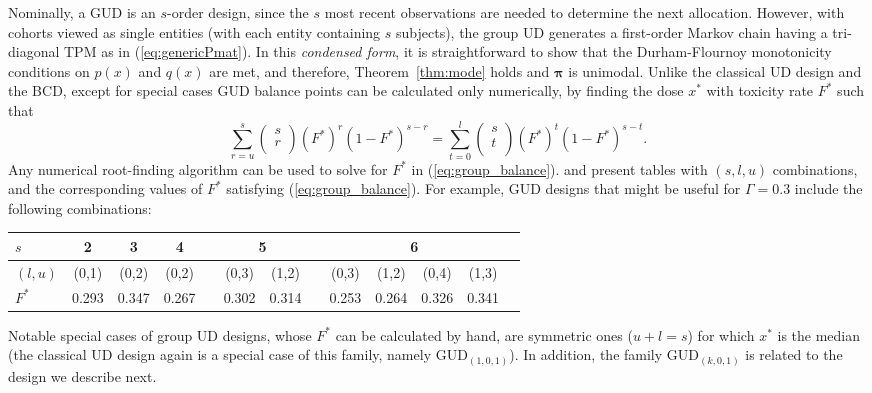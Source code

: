 Nominally, a GUD is an $s$-order design, since the $s$ most recent observations are needed to determine the next allocation. However, with cohorts viewed as single entities (with each entity containing $s$ subjects), the group UD generates a first-order Markov chain having a tri-diagonal TPM as in (\ref{eq:genericPmat}). In this \emph{condensed form}, it is straightforward to show that the Durham-Flournoy monotonicity conditions on $p(x)$ and $q(x)$ are met, and therefore, Theorem~\ref{thm:mode} holds and $\boldsymbol{\pi}$ is unimodal.   Unlike the classical UD design and the BCD, except for special cases GUD balance points can be calculated only numerically, by finding the dose $x^*$ with toxicity rate $F^*$ such that
%
\begin{equation}\label{eq:group_balance}
\sum_{r=u}^s
\left(\begin{array}{c}
s\\
r\\
\end{array}\right) \left(F^*\right)^r(1-F^*)^{s-r}=
\sum_{t=0}^{l}
\left(\begin{array}{c}
s\\
t\\
\end{array}\right) \left(F^*\right)^t(1-F^*)^{s-t}.
\end{equation}
%
Any numerical root-finding algorithm can be used to solve for $F^*$ in (\ref{eq:group_balance}). \cite{Gezm:Flou:Grou:2006} and \cite{Ivan:Flou:Chun:Cumu:2007} present tables with $(s,l,u)$ combinations, and the corresponding values of $F^*$ satisfying (\ref{eq:group_balance}). For example, GUD designs that might be useful for $\Gamma=0.3$ include the following combinations:

\begin{center}
\begin{small}
\begin{tabular}{lcccccccccccc}
\toprule
$s$ & 2 & 3 & 4 & & \multicolumn{2}{c}{5} &  &   \multicolumn{4}{c}{6} \\
\midrule
$(l,u)$ & (0,1)& (0,2)& (0,2)& & (0,3)& (1,2) & &  (0,3)& (1,2) &  (0,4)& (1,3) \\
$F^*$ & 0.293 &  0.347 & 0.267 & & 0.302 & 0.314  & & 0.253 & 0.264 & 0.326 & 0.341\\
\bottomrule
\end{tabular}
\end{small}
\end{center}

Notable special cases of group UD designs, whose $F^*$ can be calculated by hand, are symmetric ones ($u+l=s$) for which $x^*$ is the median (the classical UD design again is a special case of this family, namely GUD$_{(1,0,1)}$). In addition, the family GUD$_{(k,0,1)}$ is related to the design we describe next.


